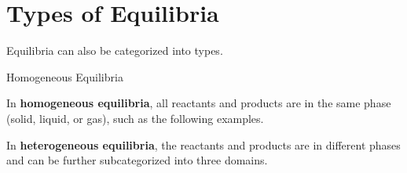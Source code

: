 \documentclass[10pt]{article}
\begin{document}
\section{Types of Equilibria}

  Equilibria can also be categorized into types.

  \begin{core}{Homogeneous Equilibria}
    
    In \textbf{homogeneous equilibria}, all reactants and products are in the same phase (solid, liquid, or gas), such as the following examples.




  \end{core}
  
  In \textbf{heterogeneous equilibria}, the reactants and products are in different phases and can be further subcategorized into three domains.  
\end{document}
